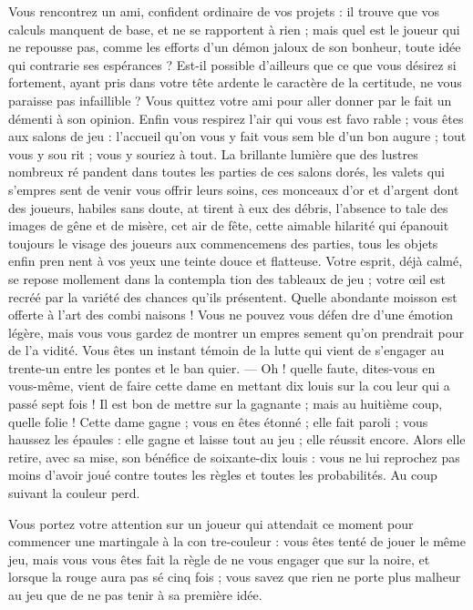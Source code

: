 Vous rencontrez un ami, confident
ordinaire de vos projets : il trouve que
vos calculs manquent de base, et ne
se rapportent à rien ; mais quel est le
joueur qui ne repousse pas, comme
les efforts d'un démon jaloux de son
bonheur, toute idée qui contrarie ses
espérances ? Est-il possible d'ailleurs
que ce que vous désirez si fortement,
ayant pris dans votre tête ardente le
caractère de la certitude, ne vous
paraisse pas infaillible ? Vous quittez
votre ami pour aller donner par le
fait un démenti à son opinion. Enfin
vous respirez l'air qui vous est favo%
rable ; vous êtes aux salons de jeu :
l'accueil qu'on vous y fait vous sem%
ble d'un bon augure ; tout vous y sou%
rit ; vous y souriez à tout. La brillante
lumière que des lustres nombreux ré%
pandent dans toutes les parties de ces
salons dorés, les valets qui s'empres%
sent de venir vous offrir leurs soins,
ces monceaux d'or et d'argent dont
des joueurs, habiles sans doute, at%
tirent à eux des débris, l'absence to%
tale des images de gêne et de misère,
cet air de fête, cette aimable hilarité
qui épanouit toujours le visage des
joueurs aux commencemens des
parties, tous les objets enfin pren%
nent à vos yeux une teinte douce et
flatteuse. Votre esprit, déjà calmé, se
repose mollement dans la contempla%
tion des tableaux de jeu ; votre œil
est recréé par la variété des chances
qu'ils présentent. Quelle abondante
moisson est offerte à l'art des combi%
naisons ! Vous ne pouvez vous défen%
dre d'une émotion légère, mais vous
vous gardez de montrer un empres%
sement qu'on prendrait pour de l'a%
vidité. Vous êtes un instant témoin
de la lutte qui vient de s'engager au
trente-un entre les pontes et le ban%
quier. --- Oh ! quelle faute, dites-vous
en vous-même, vient de faire cette
dame en mettant dix louis sur la cou%
leur qui a passé sept fois ! Il est bon
de mettre sur la gagnante ; mais au
huitième coup, quelle folie ! Cette
dame gagne ; vous en êtes étonné ; elle
fait paroli ; vous haussez les épaules :
elle gagne et laisse tout au jeu ; elle
réussit encore. Alors elle retire, avec
sa mise, son bénéfice de soixante-dix
louis : vous ne lui reprochez pas moins
d'avoir joué contre toutes les règles
et toutes les probabilités. Au coup
suivant la couleur perd. 

Vous portez votre attention sur un
joueur qui attendait ce moment pour
commencer une martingale à la con%
tre-couleur : vous êtes tenté de jouer
le même jeu, mais vous vous êtes fait
la règle de ne vous engager que sur
la noire, et lorsque la rouge aura pas%
sé cinq fois ; vous savez que rien ne
porte plus malheur au jeu que de ne
pas tenir à sa première idée. 

